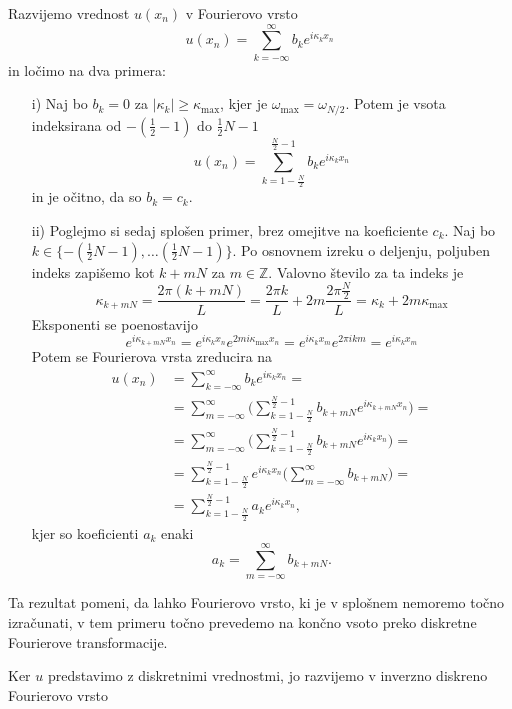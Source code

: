 \documentclass[mat2, tisk]{fmfdelo}
\newcommand{\Z}{\mathbb Z}
\begin{document}
\begin{dokaz}
Razvijemo vrednost $u(x_n)$ v Fourierovo vrsto 
$$
u(x_n) = \sum_{k=-\infty}^{\infty} b_k e^{i\kappa_k x_n}
$$
in ločimo na dva primera: \\
\begin{enumerate}
  \item[i)] Naj bo $b_k = 0$ za $|\kappa_k| \geq \kappa_{\text{max}}$, kjer je 
  $\omega_{\text{max}} = \omega_{N/2}$. Potem je vsota indeksirana od 
  $-(\frac{1}{2} - 1)$ do $\frac{1}{2}N - 1$
  $$
  u(x_n) = \sum_{k=1-\frac{N}{2}}^{\frac{N}{2}-1} b_k e^{i\kappa_k x_n}
  $$
  in je očitno, da so $b_k = c_k$. 
  \item[ii)] Poglejmo si sedaj splošen primer, brez omejitve na koeficiente 
  $c_k$. Naj bo $k \in \{-(\frac{1}{2}N - 1), \dots (\frac{1}{2}N - 1)\}$. 
  Po osnovnem izreku o deljenju, poljuben indeks zapišemo kot
  $k + mN$ za $m\in \Z$. Valovno število za ta indeks je 
  $$
  \kappa_{k + mN} = \frac{2\pi (k + mN)}{L} = \frac{2\pi k}{L} + 2m\frac{2\pi \frac{N}{2}}{L} = \kappa_k + 2m \kappa_{\text{max}}
  $$
  Eksponenti se poenostavijo 
  $$
  e^{i \kappa_{k + mN} x_n} =  e^{i \kappa_{k} x_n}  e^{2mi\kappa_{\text{max}} x_n} = 
  e^{i\kappa_k x_m} e^{2\pi i k m} = e^{i\kappa_k x_m}
  $$
  Potem se Fourierova vrsta zreducira na 
  \begin{align*}
  u(x_n) &= \sum_{k=-\infty}^{\infty} b_k e^{i\kappa_k x_n} = \\
         &= \sum_{m=-\infty}^{\infty} \Big(\sum_{k=1-\frac{N}{2}}^{\frac{N}{2}-1} b_{k+mN} e^{i\kappa_{k+mN} x_n}\Big) =\\ 
         &= \sum_{m=-\infty}^{\infty} \Big(\sum_{k=1-\frac{N}{2}}^{\frac{N}{2}-1} b_{k+mN} e^{i\kappa_{k} x_n}\Big) =\\ 
         &= \sum_{k=1-\frac{N}{2}}^{\frac{N}{2}-1} e^{i\kappa_{k} x_n}\Big(\sum_{m=-\infty}^{\infty} b_{k+mN}\Big) =\\
         &= \sum_{k=1-\frac{N}{2}}^{\frac{N}{2}-1} a_k e^{i\kappa_{k} x_n},
\end{align*}
kjer so koeficienti $a_k$ enaki 
$$a_k = \sum_{m=-\infty}^{\infty} b_{k+mN}.$$
\end{enumerate}
\end{dokaz}

Ta rezultat pomeni, da lahko Fourierovo vrsto, ki je v splošnem nemoremo 
točno izračunati, v tem primeru točno prevedemo na končno vsoto preko 
diskretne Fourierove transformacije.



\newpage
Ker $u$ predstavimo z diskretnimi vrednostmi, jo razvijemo v 
inverzno diskreno Fourierovo vrsto 
\end{document}
